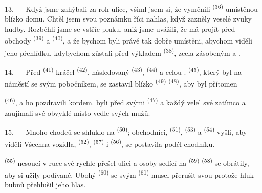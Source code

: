 13. --- Když jsme zahýbali za roh ulice, všiml jsem si, že vyměnili 
\textsuperscript{(36)} umístěnou blízko  domu. Chtěl jsem svou poznámku říci
nahlas, když zazněly veselé zvuky  hudby. Rozběhli jsme se vstříc pluku, aniž
jsme uvážili, že  má projít před obchody
 \textsuperscript{(39)} a 
\textsuperscript{(40)}, a že bychom byli právě tak dobře umístěni, abychom viděli jeho
přehlídku, kdybychom zůstali před výkladem  \textsuperscript{(38)}, zcela
zásobeným  a .

\VUsaut{3.0mm}

14. --- Před  \textsuperscript{(41)} kráčel 
\textsuperscript{(42)}, následovaný  \textsuperscript{(43)},
 \textsuperscript{(44)} a celou . 
\textsuperscript{(45)}, který byl na náměstí se svým pobočníkem, se zastavil blízko
 \textsuperscript{(49)}  \textsuperscript{(48)}, aby
byl přítomen 

 \textsuperscript{(46)},  a
 ho pozdravili kordem.  byli před svými
 \textsuperscript{(47)} a každý  velel své
 zatímco   a 
zaujímali své obvyklé místo vedle svých mužů.

15. --- Mnoho chodců se shluklo na  \textsuperscript{(50)}; obchodníci,
 \textsuperscript{(51)},  \textsuperscript{(53)} a
 \textsuperscript{(54)} vyšli, aby viděli
 Všechna vozidla,  \textsuperscript{(52)},
 \textsuperscript{(57)} i 
\textsuperscript{(56)}, se postavila podél chodníku.

\VUsaut{3.0mm}

 \textsuperscript{(55)} nesoucí v ruce své  rychle přešel ulici a osoby sedící na  \textsuperscript{(59)}
 \textsuperscript{(58)} se obrátily, aby si užily podívané. Ubohý
 \textsuperscript{(60)} se svým
 \textsuperscript{(61)} musel přerušit svou 
protože hluk bubnů přehlušil jeho hlas.

